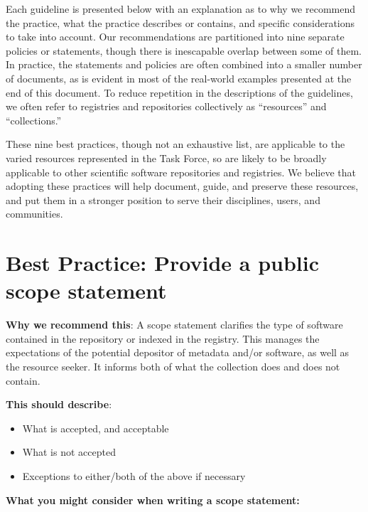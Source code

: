 \documentclass[11pt]{article}
\begin{document}
Each guideline is presented below with an explanation as to why we recommend the practice, what the practice describes or contains, and specific considerations to take into account.  Our recommendations are partitioned into nine separate policies or statements, though there is inescapable overlap between some of them. In practice, the statements and policies are often combined into a smaller number of documents, as is evident in most of the real-world examples presented at the end of this document. To reduce repetition in the descriptions of the guidelines, we often refer to registries and repositories collectively as ``resources'' and ``collections.''  

These nine best practices, though not an exhaustive list, are applicable to the varied resources represented in the Task Force, so are likely to be broadly applicable to other scientific software repositories and registries. We believe that adopting these practices will help document, guide, and preserve these resources, and put them in a stronger position to serve their disciplines, users, and communities.


\section{Best Practice: Provide a public scope statement}
\label{best-practice-provide-a-public-scope-statement}

\textbf{Why we recommend this}: A scope statement clarifies the type of software contained in the repository or indexed in the registry. This manages the expectations of the potential depositor of metadata and/or software, as well as the resource seeker. It informs both of what the collection does and does not contain.

\textbf{This should describe}:

\begin{itemize}
\item What is accepted, and acceptable

\item What is not accepted

\item Exceptions to either/both of the above if necessary

\end{itemize}

\textbf{What you might consider when writing a scope statement: }
\end{document}
